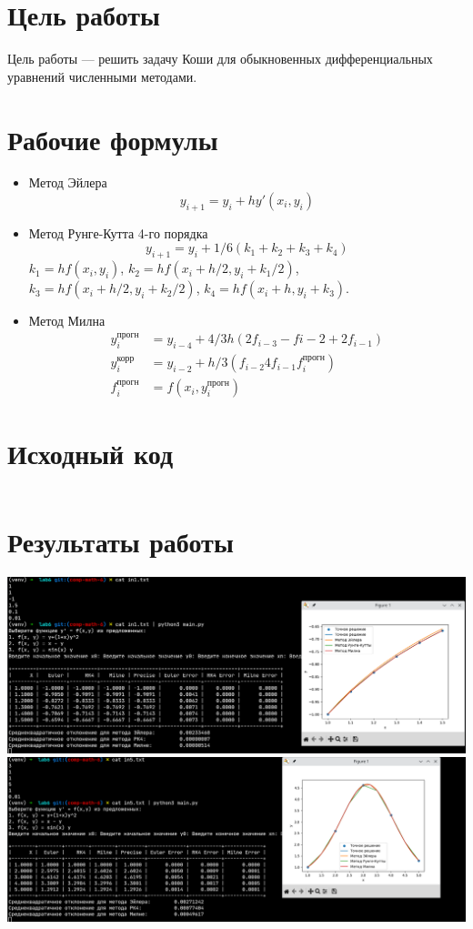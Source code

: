 \section{Цель работы}
Цель работы --- решить задачу Коши для обыкновенных
дифференциальных уравнений численными методами.

\section{Рабочие формулы}
\begin{itemize}
\item Метод Эйлера
  \[ y_{i+1} = y_i + h y'(x_i, y_i) \]
\item Метод Рунге-Кутта 4-го порядка
  \[ y_{i+1} = y_i + 1/6 (k_1 + k_2 + k_3 + k_4) \]
  \(k_1 = h f(x_i, y_i)\), \(k_2 = h f (x_i + h/2, y_i + k_1 / 2 )\),
  \( k_3 = h f(x_i + h/2, y_i + k_2 / 2) \),
  \( k_4 = h f(x_i + h, y_i + k_3) \).
\item Метод Милна
  \begin{align*}
    y_i^\text{прогн} &= y_{i-4} + 4/3 h ( 2 f_{i-3} - f{i-2} + 2 f_{i-1} ) \\
    y_i^\text{корр}  &= y_{i-2} + h/3 (f_{i-2} 4 f_{i-1} f_i^\text{прогн}) \\
    f_i^\text{прогн} &= f(x_i, y_i^\text{прогн})
  \end{align*}
\end{itemize}

\section{Исходный код}
\inputminted[breaklines]{python}{../main.py}

\section{Результаты работы}
\begin{center}
\includegraphics[width=\textwidth]{./img/demo1.png}
\includegraphics[width=\textwidth]{./img/demo2.png}
\end{center}

